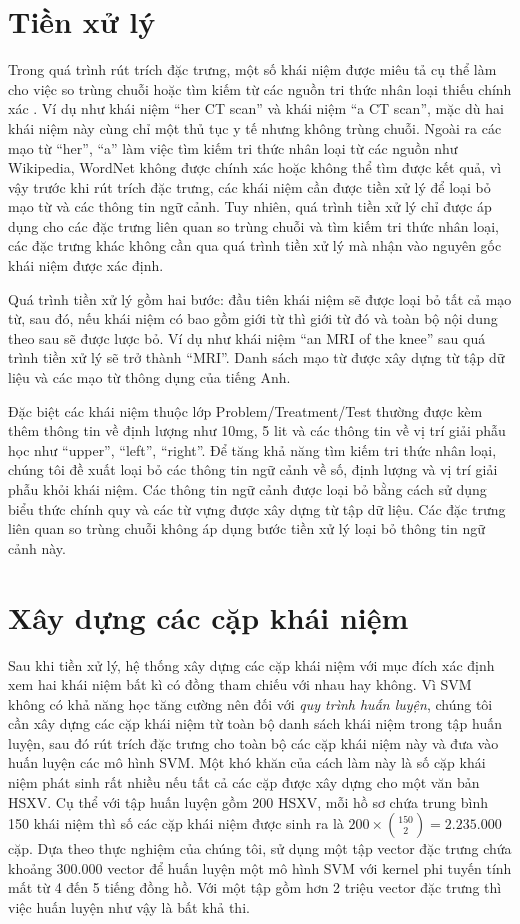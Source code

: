 \section{Tiền xử lý}
Trong quá trình rút trích đặc trưng, một số khái niệm được miêu tả cụ thể làm cho việc so trùng chuỗi hoặc tìm kiếm từ các nguồn tri thức nhân loại thiếu chính xác \cite{YanXu2012}. Ví dụ như khái niệm ``her CT scan'' và khái niệm ``a CT scan'', mặc dù hai khái niệm này cùng chỉ một thủ tục y tế nhưng không trùng chuỗi. Ngoài ra các mạo từ ``her'', ``a'' làm việc tìm kiếm tri thức nhân loại từ các nguồn như Wikipedia, WordNet không được chính xác hoặc không thể tìm được kết quả, vì vậy trước khi rút trích đặc trưng, các khái niệm cần được tiền xử lý để loại bỏ mạo từ và các thông tin ngữ cảnh. Tuy nhiên, quá trình tiền xử lý chỉ được áp dụng cho các đặc trưng liên quan so trùng chuỗi và tìm kiếm tri thức nhân loại, các đặc trưng khác không cần qua quá trình tiền xử lý mà nhận vào nguyên gốc khái niệm được xác định.

Quá trình tiền xử lý gồm hai bước: đầu tiên khái niệm sẽ được loại bỏ tất cả mạo từ, sau đó, nếu khái niệm có bao gồm giới từ thì giới từ đó và toàn bộ nội dung theo sau sẽ được lược bỏ. Ví dụ như khái niệm “an MRI of the knee” sau quá trình tiền xử lý sẽ trở thành “MRI”. Danh sách mạo từ được xây dựng từ tập dữ liệu và các mạo từ thông dụng của tiếng Anh.

Đặc biệt các khái niệm thuộc lớp Problem/Treatment/Test thường được kèm thêm thông tin về định lượng như 10mg, 5 lit và các thông tin về vị trí giải phẫu học như ``upper'', ``left'', ``right''. Để tăng khả năng tìm kiếm tri thức nhân loại, chúng tôi đề xuất loại bỏ các thông tin ngữ cảnh về số, định lượng và vị trí giải phẫu khỏi khái niệm. Các thông tin ngữ cảnh được loại bỏ bằng cách sử dụng biểu thức chính quy và các từ vựng được xây dựng từ tập dữ liệu. Các đặc trưng liên quan so trùng chuỗi không áp dụng bước tiền xử lý loại bỏ thông tin ngữ cảnh này.

\section{Xây dựng các cặp khái niệm}
Sau khi tiền xử lý, hệ thống xây dựng các cặp khái niệm với mục đích xác định xem hai khái niệm bất kì có đồng tham chiếu với nhau hay không. Vì SVM không có khả năng học tăng cường nên đối với \emph{quy trình huấn luyện}, chúng tôi cần xây dựng các cặp khái niệm từ toàn bộ danh sách khái niệm trong tập huấn luyện, sau đó rút trích đặc trưng cho toàn bộ các cặp khái niệm này và đưa vào huấn luyện các mô hình SVM. Một khó khăn của cách làm này là số cặp khái niệm phát sinh rất nhiều nếu tất cả các cặp được xây dựng cho một văn bản HSXV. Cụ thể với tập huấn luyện gồm 200 HSXV, mỗi hồ sơ chứa trung bình 150 khái niệm thì số các cặp khái niệm được sinh ra là $200\times \binom{150}{2}=2.235.000$ cặp. Dựa theo thực nghiệm của chúng tôi, sử dụng một tập vector đặc trưng chứa khoảng 300.000 vector để huấn luyện một mô hình SVM với kernel phi tuyến tính mất từ 4 đến 5 tiếng đồng hồ. Với một tập gồm hơn 2 triệu vector đặc trưng thì việc huấn luyện như vậy là bất khả thi.

